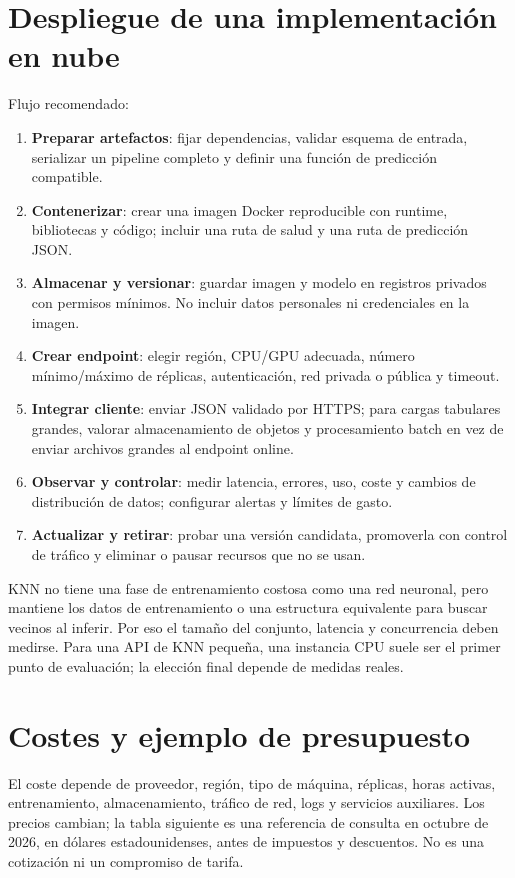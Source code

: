 \documentclass[11pt,a4paper]{article}
\begin{document}
\section{Despliegue de una implementación en nube}
Flujo recomendado:
\begin{enumerate}
  \item \textbf{Preparar artefactos}: fijar dependencias, validar esquema de entrada, serializar un pipeline completo y definir una función de predicción compatible.
  \item \textbf{Contenerizar}: crear una imagen Docker reproducible con runtime, bibliotecas y código; incluir una ruta de salud y una ruta de predicción JSON.
  \item \textbf{Almacenar y versionar}: guardar imagen y modelo en registros privados con permisos mínimos. No incluir datos personales ni credenciales en la imagen.
  \item \textbf{Crear endpoint}: elegir región, CPU/GPU adecuada, número mínimo/máximo de réplicas, autenticación, red privada o pública y timeout.
  \item \textbf{Integrar cliente}: enviar JSON validado por HTTPS; para cargas tabulares grandes, valorar almacenamiento de objetos y procesamiento batch en vez de enviar archivos grandes al endpoint online.
  \item \textbf{Observar y controlar}: medir latencia, errores, uso, coste y cambios de distribución de datos; configurar alertas y límites de gasto.
  \item \textbf{Actualizar y retirar}: probar una versión candidata, promoverla con control de tráfico y eliminar o pausar recursos que no se usan.
\end{enumerate}
KNN no tiene una fase de entrenamiento costosa como una red neuronal, pero mantiene los datos de entrenamiento o una estructura equivalente para buscar vecinos al inferir. Por eso el tamaño del conjunto, latencia y concurrencia deben medirse. Para una API de KNN pequeña, una instancia CPU suele ser el primer punto de evaluación; la elección final depende de medidas reales.

\section{Costes y ejemplo de presupuesto}
El coste depende de proveedor, región, tipo de máquina, réplicas, horas activas, entrenamiento, almacenamiento, tráfico de red, logs y servicios auxiliares. Los precios cambian; la tabla siguiente es una referencia de consulta en octubre de 2026, en dólares estadounidenses, antes de impuestos y descuentos. No es una cotización ni un compromiso de tarifa.
\end{document}
